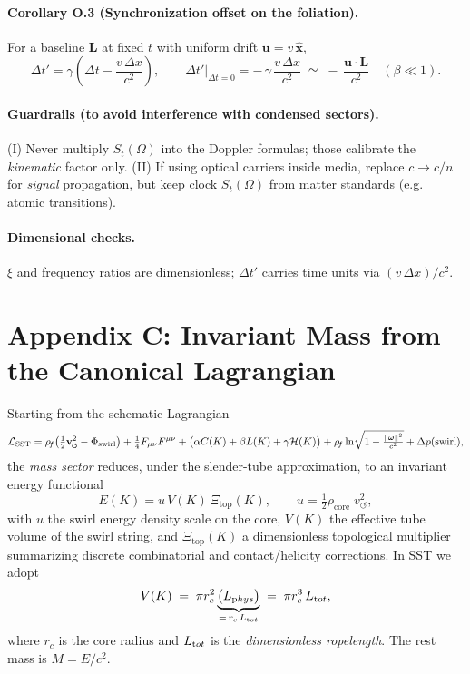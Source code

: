 \documentclass[11pt]{article}
\begin{document}
		\paragraph{Corollary O.3 (Synchronization offset on the foliation).}
		For a baseline $\mathbf L$ at fixed $t$ with uniform drift $\mathbf u = v\,\hat{\mathbf x}$,
		\[
			\Delta t'=\gamma\!\left(\Delta t-\frac{v\,\Delta x}{c^2}\right),
			\qquad
			\Delta t'\big|_{\Delta t=0}=-\,\gamma\,\frac{v\,\Delta x}{c^2}
			\;\simeq\; -\,\frac{\mathbf u\!\cdot\!\mathbf L}{c^2}\quad (\beta\ll 1).
		\]

		\paragraph{Guardrails (to avoid interference with condensed sectors).}
		(I) Never multiply $S_t(\Omega)$ into the Doppler formulas; those calibrate the \emph{kinematic} factor only.
		(II) If using optical carriers inside media, replace $c\!\to\! c/n$ for \emph{signal} propagation, but keep clock $S_t(\Omega)$ from matter standards (e.g. atomic transitions).

		\paragraph{Dimensional checks.}
		$\xi$ and frequency ratios are dimensionless; $\Delta t'$ carries time units via $(v\,\Delta x)/c^2$.




\section*{Appendix C: Invariant Mass from the Canonical Lagrangian}

        Starting from the schematic Lagrangian
        \[
            \mathcal{L}_{\text{SST}}
            = \rhof\!\left(\tfrac{1}{2}\vswirl^2 - \Phi_{\text{swirl}}\right)
            + \tfrac{1}{4}F_{\mu\nu}F^{\mu\nu}
            + \big(\alpha C(K)+\beta L(K)+\gamma \mathcal{H}(K)\big)
            + \rhof \ln\!\sqrt{1-\tfrac{\|\boldsymbol\omega\|^2}{c^2}}
            + \Delta p(\text{swirl}),
        \]
        the \emph{mass sector} reduces, under the slender-tube approximation, to an invariant energy functional
        \[
            E(K)= u\,V(K)\,\Xi_{\text{top}}(K),\qquad
            u=\tfrac{1}{2}\rho_{\text{core}}\;v_{\circlearrowleft}^{2},
        \]
        with $u$ the swirl energy density scale on the core, $V(K)$ the effective tube volume of the swirl string, and $\Xi_{\text{top}}(K)$ a dimensionless topological multiplier summarizing discrete combinatorial and contact/helicity corrections. In SST we adopt
        \[
            V(K)\;=\;\pi r_c^2 \underbrace{\big(L_{\textrm phys}\big)}_{=\,r_c\,L_{\textrm tot}}
            \;=\;\pi r_c^3\,L_{\textrm tot},
        \]
        where $r_c$ is the core radius and $L_{\textrm tot}$ is the \emph{dimensionless ropelength}. The rest mass is $M=E/c^2$.
\end{document}
